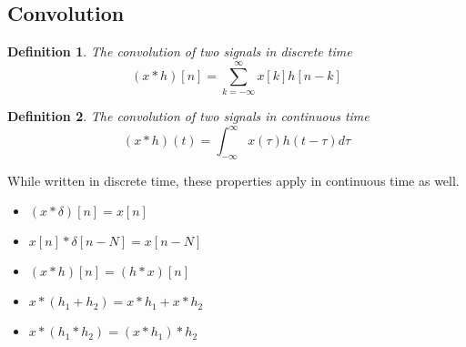 \documentclass{article}
\newtheorem{definition}{Definition}
\begin{document}
\subsection{Convolution}
\begin{definition}
    The convolution of two signals in discrete time
    $$(x*h)[n] = \sum_{k=-\infty}^{\infty}{x[k]h[n-k]}$$
\end{definition}
\begin{definition}
    The convolution of two signals in continuous time
    $$(x*h)(t) = \int_{-\infty}^{\infty}{x(\tau)h(t-\tau)d\tau}$$
\end{definition}
While written in discrete time, these properties apply in continuous time as well.
\begin{itemize}
    \item $(x*\delta)[n] = x[n]$
    \item $x[n]*\delta[n-N]=x[n-N]$
    \item $(x*h)[n] = (h*x)[n]$
    \item $x * (h_1 + h_2) = x*h_1 + x*h_2$
    \item $x * (h_1 * h_2) = (x * h_1) * h_2$
\end{itemize}
\end{document}

